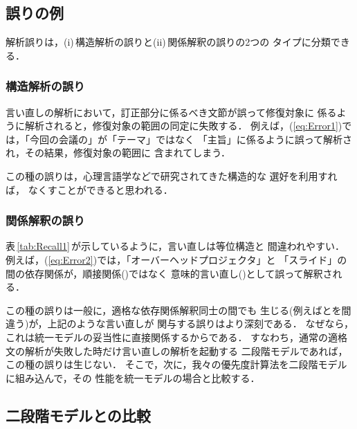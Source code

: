 \subsection{誤りの例}\label{sec:Evaluation:Error}

解析誤りは，(i)\,構造解析の誤りと(ii)\,関係解釈の誤りの2つの
タイプに分類できる．

\subsubsection*{構造解析の誤り}

言い直しの解析において，訂正部分に係るべき文節が誤って修復対象に
係るように解析されると，修復対象の範囲の同定に失敗する．
例えば，(\ref{eq:Error1})では，「今回の会議の」が「テーマ」ではなく
「主旨」に係るように誤って解析され，その結果，修復対象の範囲に
含まれてしまう．

この種の誤りは，心理言語学などで研究されてきた構造的な
選好\cite{Kimball:Cog-2-1-15,Hobbs:COLING90-162}を利用すれば，
なくすことができると思われる．

\subsubsection*{関係解釈の誤り}

表\,\ref{tab:Recall1}\,が示しているように，言い直しは等位構造と
間違われやすい．
例えば，(\ref{eq:Error2})では，「オーバーヘッドプロジェクタ」と
「スライド」の間の依存関係が，順接関係()ではなく
意味的言い直し()として誤って解釈される．

この種の誤りは一般に，適格な依存関係解釈同士の間でも
生じる(例えばとを間違う)が，上記のような言い直しが
関与する誤りはより深刻である．
なぜなら，これは統一モデルの妥当性に直接関係するからである．
すなわち，通常の適格文の解析が失敗した時だけ言い直しの解析を起動する
二段階モデルであれば，この種の誤りは生じない．
そこで，次に，我々の優先度計算法を二段階モデルに組み込んで，その
性能を統一モデルの場合と比較する．

\subsection{二段階モデルとの比較}\label{sec:Evaluation:Two-stage}

